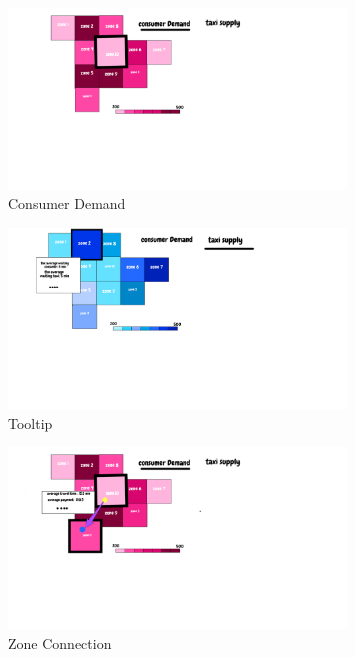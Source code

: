 \documentclass{article}
\begin{document}
              \begin{figure}[h!]
                \centering
                \includegraphics[width=0.8\textwidth]{sketch/consumer_demand.png}
                \caption{Consumer Demand}
              \end{figure}  

              \begin{figure}[h!]
                \centering
                \includegraphics[width=0.8\textwidth]{sketch/stat_supply_tooltip.png}
                \caption{Tooltip}
              \end{figure}  

              \begin{figure}[h!]
                \centering
                \includegraphics[width=0.8\textwidth]{sketch/stat_demand-tooltip.png}
                \caption{Zone Connection}
              \end{figure}  

        
            
\end{document}

